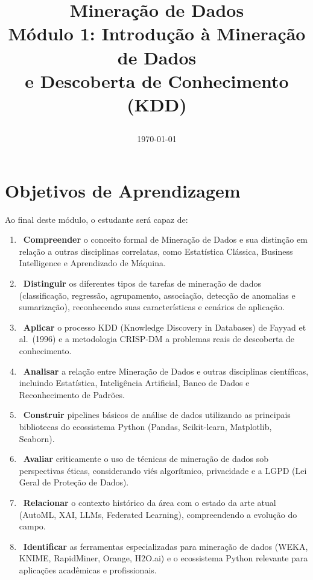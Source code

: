 \documentclass[12pt,a4paper]{article}
\title{
\begin{tcolorbox}[colback=mineblue,coltext=white,colframe=mineblue,width=\textwidth,sharp corners]
\centering

\LARGE \faIcon{database} Mineração de Dados\\[4pt]
\Large Módulo 1: Introdução à Mineração de Dados\\e Descoberta de Conhecimento (KDD)\\[6pt]
\end{tcolorbox}
}
\author{}
\date{\today}
\begin{document}
\maketitle
\thispagestyle{empty}
\newpage

\tableofcontents
\newpage

\section{Objetivos de Aprendizagem}

Ao final deste módulo, o estudante será capaz de:

\begin{enumerate}[leftmargin=*, label=\textbf{\arabic*.}]
  \item {}~\textbf{Compreender} o conceito formal de Mineração de Dados e sua distinção em relação a outras disciplinas correlatas, como Estatística Clássica, Business Intelligence e Aprendizado de Máquina.

  \item {}~\textbf{Distinguir} os diferentes tipos de tarefas de mineração de dados (classificação, regressão, agrupamento, associação, detecção de anomalias e sumarização), reconhecendo suas características e cenários de aplicação.

  \item {}~\textbf{Aplicar} o processo KDD (Knowledge Discovery in Databases) de Fayyad et al.\ (1996) e a metodologia CRISP-DM a problemas reais de descoberta de conhecimento.

  \item {}~\textbf{Analisar} a relação entre Mineração de Dados e outras disciplinas científicas, incluindo Estatística, Inteligência Artificial, Banco de Dados e Reconhecimento de Padrões.

  \item {}~\textbf{Construir} pipelines básicos de análise de dados utilizando as principais bibliotecas do ecossistema Python (Pandas, Scikit-learn, Matplotlib, Seaborn).

  \item {}~\textbf{Avaliar} criticamente o uso de técnicas de mineração de dados sob perspectivas éticas, considerando viés algorítmico, privacidade e a LGPD (Lei Geral de Proteção de Dados).

  \item {}~\textbf{Relacionar} o contexto histórico da área com o estado da arte atual (AutoML, XAI, LLMs, Federated Learning), compreendendo a evolução do campo.

  \item {}~\textbf{Identificar} as ferramentas especializadas para mineração de dados (WEKA, KNIME, RapidMiner, Orange, H2O.ai) e o ecossistema Python relevante para aplicações acadêmicas e profissionais.
\end{enumerate}
\end{document}

